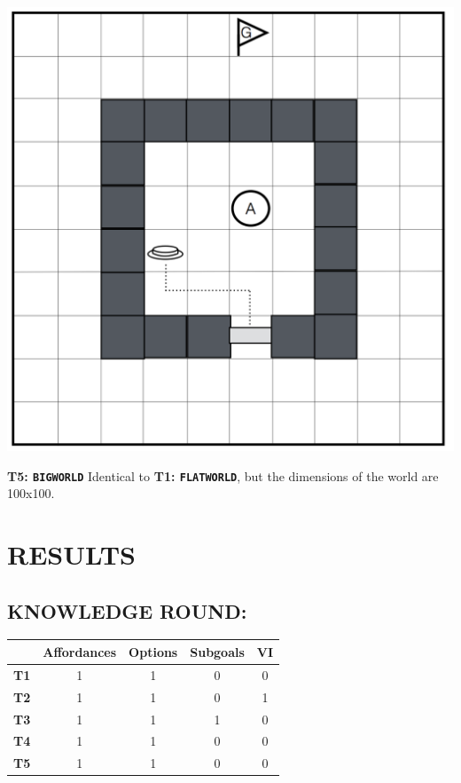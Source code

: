 \documentclass[]{article}
\begin{document}
\begin{center}
\includegraphics[scale=0.23]{figures/lightworld.png}
\end{center}


{\bf T5: \texttt{BIGWORLD}} Identical to {\bf T1: \texttt{FLATWORLD}}, but the dimensions of the world are 100x100.



\section{RESULTS}

\subsection{KNOWLEDGE ROUND:}

\begin{tabular}{ l || c | c | c | c }
  & Affordances & Options & Subgoals & VI \\
  \hline
  {\bf T1} & 1 & 1 & 0 & 0  \\
  {\bf T2} & 1 & 1 & 0 & 1 \\
  {\bf T3} & 1 & 1 & 1 & 0 \\
  {\bf T4} & 1 & 1 & 0 & 0 \\
  {\bf T5} & 1 & 1 & 0 & 0 \\
\end{tabular}
\end{document}
